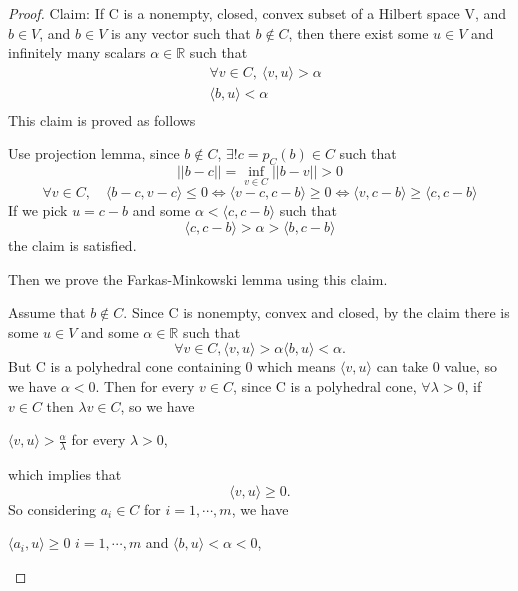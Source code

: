 \documentclass[a4paper,12pt]{report}
\begin{document}
\begin{proof}
    Claim: If C is a nonempty, closed, convex subset of a Hilbert space V, and $b\in V$, and $b\in V$ is any vector such that $b\notin C$, then there exist some $u\in V$ and infinitely many scalars $\alpha\in \mathbb R$ such that
    \begin{align*}
        &\forall v\in C, \ \langle v,u\rangle >\alpha \\
        &\langle b,u\rangle <\alpha \\
    \end{align*}
    This claim is proved as follows

    Use projection lemma, since $b\notin C$, $\exists! c=p_C(b)\in C$ such that
    \[
        ||b-c||=\inf_{v\in C} || b-v|| >0
    \]
    \[
        \forall v\in C, \quad \langle b-c,v-c \rangle \leq 0 \Leftrightarrow \langle v-c,c-b\rangle \geq 0 \Leftrightarrow \langle v,c-b\rangle\geq\langle c,c-b\rangle
    \]
    If we pick $u=c-b$ and some $\alpha<\langle c,c-b\rangle$ such that
    \[
        \langle c,c-b\rangle>\alpha>\langle b,c-b\rangle
    \]
    the claim is satisfied.

    Then we prove the Farkas-Minkowski lemma using this claim.

    Assume that $b\notin C$. Since C is nonempty, convex and closed, by the claim there is some $u\in V$ and some $\alpha\in \mathbb R$ such that
    \[
        \forall v\in C, \langle v,u \rangle >\alpha
        \langle b,u\rangle <\alpha.
    \]
    But C is a polyhedral cone containing 0 which means $\langle v,u\rangle$ can take 0 value, so we have $\alpha<0$. Then for every $v\in C$, since C is a polyhedral cone, $\forall \lambda >0$, if $v\in C$ then $\lambda v\in C$, so we have
    \begin{center}
        $\langle v,u\rangle >\frac{\alpha}{\lambda}$ for every $\lambda>0$,
    \end{center}
    which implies that
    \[
        \langle v,u\rangle\geq 0.
    \]
    So considering $a_i\in C$ for $i=1,\cdots,m$, we have 
    \begin{center}
        $\langle a_i,u\rangle \geq 0$ $i=1,\cdots,m$ and $\langle b,u\rangle <\alpha<0$,
    \end{center}
\end{proof}
\end{document}

